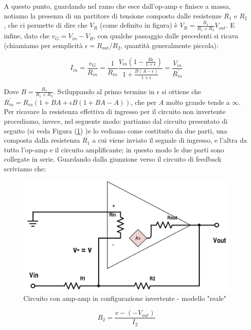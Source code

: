 \documentclass[journal, a4paper]{IEEEtran}
\begin{document}
A questo punto, guardando nel ramo che esce dall'op-amp e finisce a massa, notiamo la presenza di un partitore di tensione composto dalle resistenze $R_1$ e $R_2$, che ci permette di dire che $V_R$ (come definito in figura) è $V_R = \frac{R_1}{R_1 + R_2}V_{out}$. E infine, dato che $v_G = V_{in} - V_{R}$, con qualche passaggio dalle precedenti si ricava (chiamiamo per semplicità $\epsilon = R_{out}/R_2$, quantità generalmente piccola):

\begin{equation}
I_{in} = \frac{v_G}{R_{in}} =  \frac{1}{R_{in}} \frac{V_{in}(1-\frac{B\epsilon}{1+ \epsilon})}{1 + \frac{B(A-\epsilon)}{1+\epsilon}} = \frac{V_{in}}{R_{in}^{'}}
\end{equation}

Dove $B = \frac{R_1}{R_1 + R_2}$. Sviluppando al primo termine in $\epsilon$ si ottiene che $ R_{in}^{'} = R_{in} (1 + BA + \epsilon B (1+BA-A))$, che per $A$ molto grande tende a $\infty$.\\

Per ricavare la resistenza effettiva di ingresso per il circuito non invertente procediamo, invece, nel seguente modo: partiamo dal circuito presentato di seguito (si veda Figura (\ref{fig:op-amp-invert}) )e lo vediamo come costituito da due parti, una composta dalla resistenza $R_1$ a cui viene inviato il segnale di ingresso, e l'altra da tutto l'op-amp e il circuito amplificante; in questo modo le due parti sono collegate in serie. Guardando dalla giunzione verso il circuito di feedback scriviamo che:

\begin{figure}
\centering
\includegraphics[width=0.7\linewidth]{./op-amp-invert}
\caption{Circuito con amp-amp in configurazione invertente - modello "reale"}
\label{fig:op-amp-invert}
\end{figure}


\begin{equation}
R_2 = \frac{v - (-V_{out})}{I_2}
\end{equation}
\end{document}
